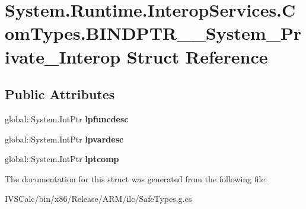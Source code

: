 \hypertarget{struct_system_1_1_runtime_1_1_interop_services_1_1_com_types_1_1_b_i_n_d_p_t_r_____system___private___interop}{}\section{System.\+Runtime.\+Interop\+Services.\+Com\+Types.\+B\+I\+N\+D\+P\+T\+R\+\_\+\+\_\+\+System\+\_\+\+Private\+\_\+\+Interop Struct Reference}
\label{struct_system_1_1_runtime_1_1_interop_services_1_1_com_types_1_1_b_i_n_d_p_t_r_____system___private___interop}
\subsection*{Public Attributes}
\begin{DoxyCompactItemize}
\item 
\mbox{\label{struct_system_1_1_runtime_1_1_interop_services_1_1_com_types_1_1_b_i_n_d_p_t_r_____system___private___interop_a3c7915aac53b266a2b9a594aef7a58dd}} 
global\+::\+System.\+Int\+Ptr {\bfseries lpfuncdesc}
\item 
\mbox{\label{struct_system_1_1_runtime_1_1_interop_services_1_1_com_types_1_1_b_i_n_d_p_t_r_____system___private___interop_a7b8a3ae61cca9bb6df62338e78f97adc}} 
global\+::\+System.\+Int\+Ptr {\bfseries lpvardesc}
\item 
\mbox{\label{struct_system_1_1_runtime_1_1_interop_services_1_1_com_types_1_1_b_i_n_d_p_t_r_____system___private___interop_a7a12abfca785ad95cf4a9ba8e9e21de4}} 
global\+::\+System.\+Int\+Ptr {\bfseries lptcomp}
\end{DoxyCompactItemize}


The documentation for this struct was generated from the following file\+:\begin{DoxyCompactItemize}
\item 
I\+V\+S\+Calc/bin/x86/\+Release/\+A\+R\+M/ilc/Safe\+Types.\+g.\+cs\end{DoxyCompactItemize}
